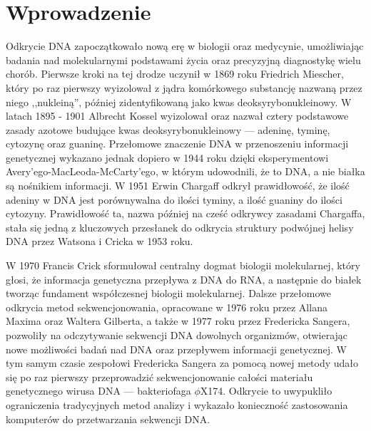 \cleardoublepage

\section{Wprowadzenie}

    Odkrycie DNA zapoczątkowało nową erę w biologii oraz medycynie, umożliwiając badania nad molekularnymi podstawami życia oraz precyzyjną diagnostykę wielu chorób\cite{Louie:2000}. Pierwsze kroki na tej drodze uczynił w 1869 roku Friedrich Miescher, który po raz pierwszy wyizolował z jądra komórkowego substancję nazwaną przez niego ,,nukleiną''\cite{Dahm:2005}, później zidentyfikowaną jako kwas deoksyrybonukleinowy. W latach 1895 - 1901 Albrecht Kossel wyizolował oraz nazwał cztery podstawowe zasady azotowe budujące kwas deoksyrybonukleinowy — adeninę, tyminę, cytozynę oraz guaninę\cite{Kossel:1893}. Przełomowe znaczenie DNA w przenoszeniu informacji genetycznej wykazano jednak dopiero w 1944 roku dzięki eksperymentowi Avery'ego-MacLeoda-McCarty'ego\cite{Avery:1944}, w którym udowodnili, że to DNA, a nie białka są nośnikiem informacji. W 1951 Erwin Chargaff odkrył prawidłowość, że ilość adeniny w DNA jest porównywalna do ilości tyminy, a ilość guaniny do ilości cytozyny\cite{Chargaff:1952}. Prawidłowość ta, nazwa później na cześć odkrywcy zasadami Chargaffa, stała się jedną z kluczowych przesłanek do odkrycia struktury podwójnej helisy DNA przez Watsona i Cricka w 1953 roku\cite{Watson:1953}.

    W 1970 Francis Crick sformułował centralny dogmat biologii molekularnej\cite{Crick:1970}, który głosi, że informacja genetyczna przepływa z DNA do RNA, a następnie do białek tworząc fundament współczesnej biologii molekularnej. Dalsze przełomowe odkrycia metod sekwencjonowania, opracowane w 1976 roku przez Allana Maxima oraz Waltera Gilberta\cite{Maxam:1977}, a także w 1977 roku przez Fredericka Sangera\cite{Sanger:1977}, pozwoliły na odczytywanie sekwencji DNA dowolnych organizmów, otwierając nowe możliwości badań nad DNA oraz przepływem informacji genetycznej. W tym samym czasie zespołowi Fredericka Sangera za pomocą nowej metody udało się po raz pierwszy przeprowadzić sekwencjonowanie całości materiału genetycznego  wirusa DNA — bakteriofaga $\phi{}$X174\cite{Sanger:1977:2}. Odkrycie to uwypukliło ograniczenia tradycyjnych metod analizy i wykazało konieczność zastosowania komputerów do przetwarzania sekwencji DNA\cite{Staden:1979}.

